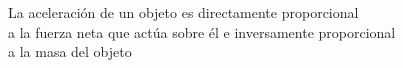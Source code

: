 \documentclass[preview]{standalone}
\begin{document}
\begin{center}
La aceleración de un objeto es directamente proporcional\\ a la fuerza neta que actúa sobre él e inversamente proporcional\\ a la masa del objeto
\end{center}
\end{document}
